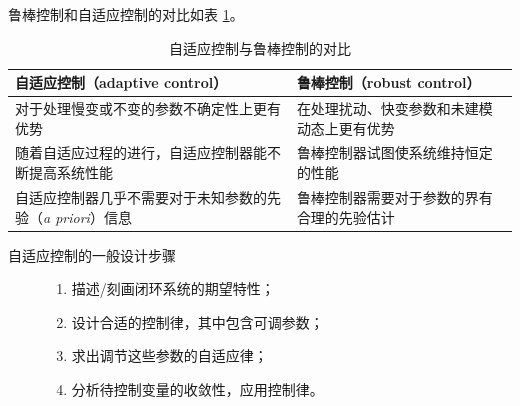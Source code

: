 鲁棒控制和自适应控制的对比如表 \ref{adaptive_robust_table}。
\newpage
  \begin{table}[htbp]
    \vspace{5pt}
    \caption{自适应控制与鲁棒控制的对比}
    \label{adaptive_robust_table}
    \setcellgapes{4pt}
    \makegapedcells
    \small
    \centering
    \begin{tabular}{p{}|p{}}
      \hline
      {\bf 自适应控制（adaptive control）} & {\bf 鲁棒控制（robust control）} \\
      \hline
      对于处理慢变或不变的参数不确定性上更有优势 & 在处理扰动、快变参数和未建模动态上更有优势\\
      \hline
      随着自适应过程的进行，自适应控制器能不断提高系统性能 & 鲁棒控制器试图使系统维持恒定的性能 \\
      \hline
      自适应控制器几乎不需要对于未知参数的先验（{\it a priori}）信息 & 鲁棒控制器需要对于参数的界有合理的先验估计\\
      \hline
    \end{tabular}
  \end{table}

\begin{description}
  \item[自适应控制的一般设计步骤] 
  \begin{enumerate}
    \item 描述/刻画闭环系统的期望特性；
    \item 设计合适的控制律，其中包含可调参数；
    \item 求出调节这些参数的自适应律；
    \item 分析待控制变量的收敛性，应用控制律。
  \end{enumerate}
\end{description}
